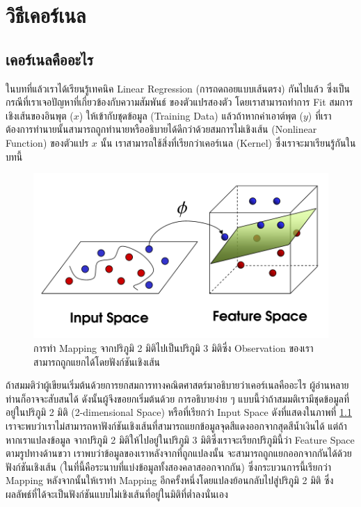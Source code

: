 

\chapter{วิธีเคอร์เนล}
\label{ch:kernel}

\section{เคอร์เนลคืออะไร}
\label{sec:kernel}

ในบทที่แล้วเราได้เรียนรู้เทคนิค Linear Regression (การถดถอยแบบเส้นตรง) กันไปแล้ว ซึ่งเป็นกรณีที่เราเจอปัญหาที่เกี่ยวข้องกับความสัมพันธ์%
ของตัวแปรสองตัว โดยเราสามารถทำการ Fit สมการเชิงเส้นของอินพุต ($x$) ให้เข้ากับชุดข้อมูล (Training Data) แล้วถ้าหากค่าเอาต์พุต 
($y$) ที่เราต้องการทำนายนั้นสามารถถูกทำนายหรืออธิบายได้ดีกว่าด้วยสมการไม่เชิงเส้น (Nonlinear Function) ของตัวแปร $x$ นั้น 
เราสามารถใช้สิ่งที่เรียกว่าเคอร์เนล (Kernel) ซึ่งเราจะมาเรียนรู้กันในบทนี้ 

\begin{figure}[htbp]
    \centering
    \includegraphics[width=0.8\linewidth]{fig/2d_to_3d_spaces.png}
    \caption{การทำ Mapping จากปริภูมิ 2 มิติไปเป็นปริภูมิ 3 มิติซึ่ง Observation ของเราสามารถถูกแยกได้โดยฟังก์ชันเชิงเส้น}
    \label{fig:2d_to_3d}
\end{figure}

ถ้าสมมติว่าผู้เขียนเริ่มต้นด้วยการยกสมการทางคณิตศาสตร์มาอธิบายว่าเคอร์เนลคืออะไร ผู้อ่านหลายท่านก็อาจจะสับสนได้ ดังนั้นผู้จึงขอยกเริ่มต้นด้วย%
การอธิบายง่าย ๆ แบบนี้ว่าถ้าสมมติเรามีชุดข้อมูลที่อยู่ในปริภูมิ 2 มิติ (2-dimensional Space) หรือที่เรียกว่า Input Space ดังที่แสดงในภาพที่ 
\ref{fig:2d_to_3d} เราจะพบว่าเราไม่สามารถหาฟังก์ชันเชิงเส้นที่สามารถแยกข้อมูลจุดสีแดงออกจากสุดสีน้ำเงินได้ แต่ถ้าหากเราแปลงข้อมูล%
จากปริภูมิ 2 มิติให้ไปอยู่ในปริภูมิ 3 มิติซึ่งเราจะเรียกปริภูมินี้ว่า Feature Space ตามรูปทางด้านขวา เราพบว่าข้อมูลของเราหลังจากที่ถูกแปลงนั้น%
จะสามารถถูกแยกออกจากกันได้ด้วยฟังก์ชันเชิงเส้น (ในที่นี้คือระนาบที่แบ่งข้อมูลทั้งสองคลาสออกจากกัน) ซึ่งกระบวนการนี้เรียกว่า Mapping 
หลังจากนั้นให้เราทำ Mapping อีกครั้งหนึ่งโดยแปลงย้อนกลับไปสู่ปริภูมิ 2 มิติ ซึ่งผลลัพธ์ที่ได้จะเป็นฟังก์ชันแบบไม่เชิงเส้นที่อยู่ในมิติที่ต่ำลงนั่นเอง 

